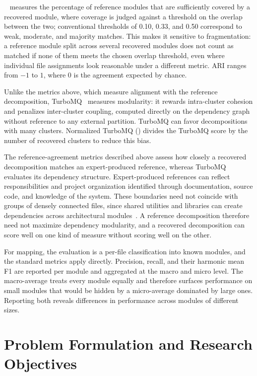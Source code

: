 \cc{}~\cite{c2c} measures the percentage of reference modules that are sufficiently covered by a recovered module, where coverage is judged against a threshold on the overlap between the two; conventional thresholds of 0.10, 0.33, and 0.50 correspond to weak, moderate, and majority matches. This makes it sensitive to fragmentation: a reference module split across several recovered modules does not count as matched if none of them meets the chosen overlap threshold, even where individual file assignments look reasonable under a different metric. ARI ranges from $-1$ to $1$, where $0$ is the agreement expected by chance.

Unlike the metrics above, which measure alignment with the reference decomposition, TurboMQ~\cite{turbomq} measures modularity: it rewards intra-cluster cohesion and penalizes inter-cluster coupling, computed directly on the dependency graph without reference to any external partition. TurboMQ can favor decompositions with many clusters. Normalized TurboMQ (\tmq{}) divides the TurboMQ score by the number of recovered clusters to reduce this bias.

The reference-agreement metrics described above assess how closely a recovered decomposition matches an expert-produced reference, whereas TurboMQ evaluates its dependency structure. Expert-produced references can reflect responsibilities and project organization identified through documentation, source code, and knowledge of the system. These boundaries need not coincide with groups of densely connected files, since shared utilities and libraries can create dependencies across architectural modules~\cite{garcia2013}. A reference decomposition therefore need not maximize dependency modularity, and a recovered decomposition can score well on one kind of measure without scoring well on the other.

For mapping, the evaluation is a per-file classification into known modules, and the standard metrics apply directly. Precision, recall, and their harmonic mean F1 are reported per module and aggregated at the macro and micro level. The macro-average treats every module equally and therefore surfaces performance on small modules that would be hidden by a micro-average dominated by large ones. Reporting both reveals differences in performance across modules of different sizes.

\chapter{Problem Formulation and Research Objectives \label{ch:research_objective}}
\chaptertoc

